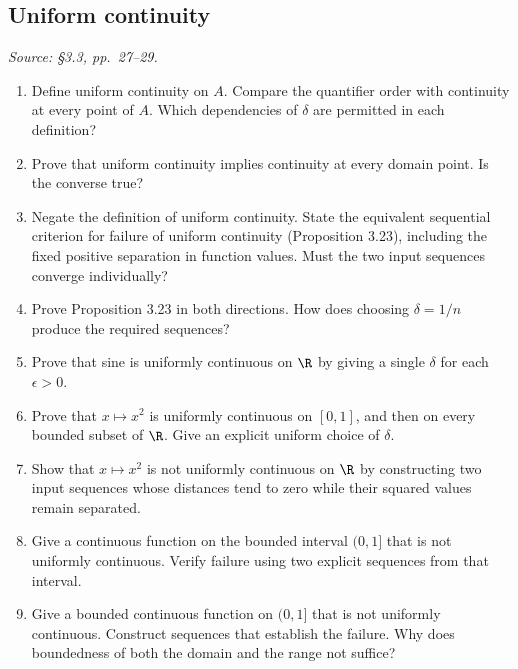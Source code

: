 \subsection{Uniform continuity}
\textit{Source: \S3.3, pp.~27--29.}

\begin{enumerate}[resume]
  \item Define uniform continuity on \(A\). Compare the quantifier
    order with continuity at every point of \(A\). Which dependencies
    of \(\delta\) are permitted in each definition?

  \item Prove that uniform continuity implies continuity at every
    domain point. Is the converse true?

  \item Negate the definition of uniform continuity. State the
    equivalent sequential criterion for failure of uniform continuity
    (Proposition 3.23), including the fixed positive separation in
    function values. Must the two input sequences converge individually?

  \item Prove Proposition 3.23 in both directions. How does choosing
    \(\delta=1/n\) produce the required sequences?

  \item Prove that sine is uniformly continuous on \(\R\) by giving
    a single \(\delta\) for each \(\epsilon>0\).

  \item Prove that \(x\mapsto x^2\) is uniformly continuous on
    \([0,1]\), and then on every bounded subset of \(\R\).
    Give an explicit uniform choice of \(\delta\).

  \item Show that \(x\mapsto x^2\) is not uniformly continuous on
    \(\R\) by constructing two input sequences whose distances tend
    to zero while their squared values remain separated.

  \item Give a continuous function on the bounded interval \((0,1]\)
    that is not uniformly continuous. Verify failure using two
    explicit sequences from that interval.

  \item Give a bounded continuous function on \((0,1]\) that is not
    uniformly continuous. Construct sequences that establish the
    failure. Why does boundedness of both the domain and the range
    not suffice?
\end{enumerate}

